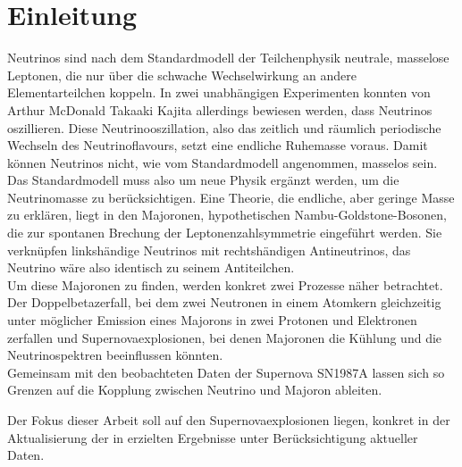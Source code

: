 \chapter{Einleitung}
\label{chap:einleitung}

Neutrinos sind nach dem Standardmodell der Teilchenphysik neutrale, masselose Leptonen, die nur über die schwache Wechselwirkung an andere Elementarteilchen koppeln.
In zwei unabhängigen Experimenten konnten von Arthur McDonald Takaaki Kajita allerdings bewiesen werden, dass Neutrinos oszillieren.
Diese Neutrinooszillation, also das zeitlich und räumlich periodische Wechseln des Neutrinoflavours, setzt eine endliche Ruhemasse voraus.
Damit können Neutrinos nicht, wie vom Standardmodell angenommen, masselos sein. \\

Das Standardmodell muss also um neue Physik ergänzt werden, um die Neutrinomasse zu berücksichtigen.
Eine Theorie, die endliche, aber geringe Masse zu erklären, liegt in den Majoronen, hypothetischen Nambu-Goldstone-Bosonen, die zur spontanen Brechung der Leptonenzahlsymmetrie eingeführt werden.
Sie verknüpfen linkshändige Neutrinos mit rechtshändigen Antineutrinos, das Neutrino wäre also identisch zu seinem Antiteilchen. \\
Um diese Majoronen zu finden, werden konkret zwei Prozesse näher betrachtet.
Der Doppelbetazerfall, bei dem zwei Neutronen in einem Atomkern gleichzeitig unter möglicher Emission eines Majorons in zwei Protonen und Elektronen zerfallen und Supernovaexplosionen, bei denen
Majoronen die Kühlung und die Neutrinospektren beeinflussen könnten. \\
Gemeinsam mit den beobachteten Daten der Supernova SN1987A lassen sich so Grenzen auf die Kopplung zwischen Neutrino und Majoron ableiten.

Der Fokus dieser Arbeit soll auf den Supernovaexplosionen liegen, konkret in der Aktualisierung der in \cite{päspaper} erzielten Ergebnisse unter Berücksichtigung aktueller Daten.


